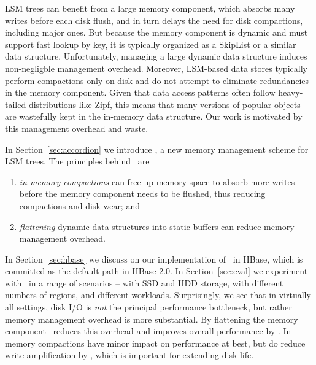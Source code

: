 LSM trees can benefit from a large memory component, which absorbs many writes before each disk flush, 
and in turn delays the need for disk compactions,  including major ones. 
But because the memory component is dynamic and must support fast lookup by key, it is typically organized as a SkipList
 or a similar data structure.  Unfortunately, managing a large dynamic data structure induces 
non-negligble management overhead. 
Moreover, 
LSM-based data stores typically perform compactions only on disk and do not attempt to eliminate redundancies in the memory component.
Given that data access patterns often follow heavy-tailed distributions like Zipf,  this means that many versions of popular objects are 
wastefully kept in the in-memory data structure. 
Our work is motivated by this management overhead and waste. 

In Section~\ref{sec:accordion}
we introduce \sys, a new memory management scheme for LSM trees.
The principles behind \sys\ are 
\begin{enumerate}
\item \emph{in-memory compactions} can free up memory space to absorb more writes before the
memory component needs to be flushed, thus reducing compactions and disk wear; and
\item \emph{flattening} dynamic data structures into static buffers can reduce memory management overhead.
\end{enumerate}

In Section~\ref{sec:hbase} we  discuss on our implementation of  \sys\ in HBase, which is committed  as the default path in HBase 2.0. 
In Section~\ref{sec:eval} we experiment with \sys\ in a range of  scenarios -- with SSD and HDD storage, with different numbers
of regions, and different workloads. Surprisingly, we see that in virtually all settings, disk I/O is \emph{not} the principal performance bottleneck,
but rather memory management overhead is more substantial. By flattening the memory component \sys\ reduces this overhead and improves overall performance by . In-memory compactions have minor impact on performance at best, but do reduce 
write amplification by , which is important for extending disk life.





